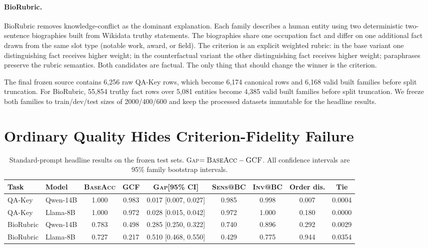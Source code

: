\documentclass[11pt]{article}
\makeatletter
\newcommand{\qwenS}{Qwen-14B\xspace}
\newcommand{\llamaS}{Llama-8B\xspace}
\newcommand{\qakey}{QA-Key\xspace}
\newcommand{\biorubric}{BioRubric\xspace}
\newcommand{\baseacc}{\textsc{BaseAcc}\xspace}
\newcommand{\gcf}{\textsc{GCF}\xspace}
\newcommand{\sens}{\textsc{Sens@BC}\xspace}
\newcommand{\invbc}{\textsc{Inv@BC}\xspace}
\newcommand{\gap}{\textsc{Gap}\xspace}
\makeatother
\begin{document}
\paragraph{BioRubric.}
\biorubric removes knowledge-conflict as the dominant explanation. Each family describes a human entity using two deterministic two-sentence biographies built from Wikidata truthy statements. The biographies share one occupation fact and differ on one additional fact drawn from the same slot type (notable work, award, or field). The criterion is an explicit weighted rubric: in the base variant one distinguishing fact receives higher weight; in the counterfactual variant the other distinguishing fact receives higher weight; paraphrases preserve the rubric semantics. Both candidates are factual. The only thing that should change the winner is the criterion.

The final frozen source contains 6,256 raw \qakey rows, which become 6,174 canonical rows and 6,168 valid built families before split truncation. For \biorubric, 55,854 truthy fact rows over 5,081 entities become 4,385 valid built families before split truncation. We freeze both families to train/dev/test sizes of 2000/400/600 and keep the processed datasets immutable for the headline results.

\section{Ordinary Quality Hides Criterion-Fidelity Failure}
\label{sec:main-results}

\begin{table}[t]
  \centering
  \small
  \begin{threeparttable}
  \caption{Standard-prompt headline results on the frozen test sets. \gap $= \baseacc - \gcf$. All confidence intervals are 95\% family bootstrap intervals.}
  \label{tab:main-results}
  \begin{tabular}{@{}llccccccc@{}}
    \toprule
    Task & Model & \baseacc & \gcf & \gap [95\% CI] & \sens & \invbc & Order dis. & Tie \\
    \midrule
    \qakey & \qwenS & 1.000 & 0.983 & 0.017 [0.007, 0.027] & 0.985 & 0.998 & 0.007 & 0.0004 \\
    \qakey & \llamaS & 1.000 & 0.972 & 0.028 [0.015, 0.042] & 0.972 & 1.000 & 0.180 & 0.0000 \\
    \midrule
    \biorubric & \qwenS & 0.783 & 0.498 & 0.285 [0.250, 0.322] & 0.740 & 0.896 & 0.292 & 0.0029 \\
    \biorubric & \llamaS & 0.727 & 0.217 & 0.510 [0.468, 0.550] & 0.429 & 0.775 & 0.944 & 0.0354 \\
    \bottomrule
  \end{tabular}
  \end{threeparttable}
\end{table}
\end{document}
